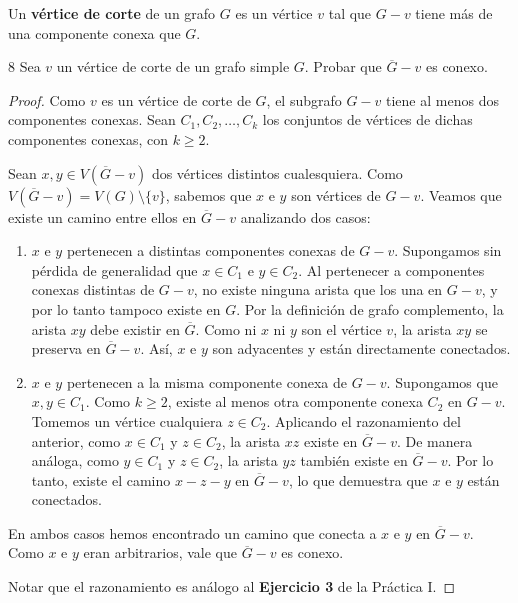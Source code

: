 \begin{definition}
    Un \textbf{vértice de corte} de un grafo \( G \) es un vértice \( v \) tal que \( G - v \) tiene más de una componente conexa que \( G \).
\end{definition}

\begin{ejercicio}{8}
    Sea \( v \) un vértice de corte de un grafo simple \( G \). Probar que \( \overline{G} - v \) es conexo.
\end{ejercicio}
\begin{proof}
    Como \( v \) es un vértice de corte de \( G \), el subgrafo \( G - v \) tiene al menos dos componentes conexas. Sean \( C_1, C_2, \dots, C_k \) los conjuntos de vértices de dichas componentes conexas, con \( k \ge 2 \).

    Sean \( x, y \in V(\overline{G} - v) \) dos vértices distintos cualesquiera. Como \( V(\overline{G} - v) = V(G) \setminus \{v\} \), sabemos que \( x \) e \( y \) son vértices de \( G - v \). Veamos que existe un camino entre ellos en \( \overline{G} - v \) analizando dos casos:

    \begin{enumerate}
        \item[I:] \( x \) e \( y \) pertenecen a distintas componentes conexas de \( G - v \).
              Supongamos sin pérdida de generalidad que \( x \in C_1 \) e \( y \in C_2 \). Al pertenecer a componentes conexas distintas de \( G - v \), no existe ninguna arista que los una en \( G - v \), y por lo tanto tampoco existe en \( G \). Por la definición de grafo complemento, la arista \( xy \) debe existir en \( \overline{G} \). Como ni \( x \) ni \( y \) son el vértice \( v \), la arista \( xy \) se preserva en \( \overline{G} - v \). Así, \( x \) e \( y \) son adyacentes y están directamente conectados.
        \item[II:] \( x \) e \( y \) pertenecen a la misma componente conexa de \( G - v \).
              Supongamos que \( x, y \in C_1 \). Como \( k \ge 2 \), existe al menos otra componente conexa \( C_2 \) en \( G - v \). Tomemos un vértice cualquiera \( z \in C_2 \).
              Aplicando el razonamiento del anterior, como \( x \in C_1 \) y \( z \in C_2 \), la arista \( xz \) existe en \( \overline{G} - v \). De manera análoga, como \( y \in C_1 \) y \( z \in C_2 \), la arista \( yz \) también existe en \( \overline{G} - v \).
              Por lo tanto, existe el camino \( x - z - y \) en \( \overline{G} - v \), lo que demuestra que \( x \) e \( y \) están conectados.
    \end{enumerate}

    En ambos casos hemos encontrado un camino que conecta a \( x \) e \( y \) en \( \overline{G} - v \). Como \( x \) e \( y \) eran arbitrarios, vale que \( \overline{G} - v \) es conexo.

    Notar que el razonamiento es análogo al \textbf{Ejercicio 3} de la Práctica I.
\end{proof}
\vspace{0.5cm}

